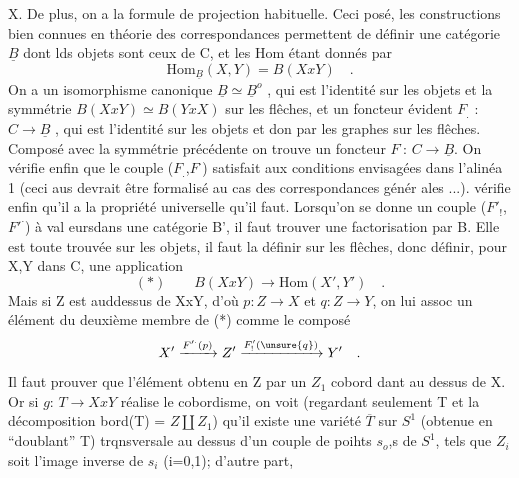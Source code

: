 
X. De plus, on a la formule de projection habituelle. Ceci posé, les
constructions bien connues en théorie des correspondances permettent
de définir une catégorie $\underline{B}$ dont lds objets sont ceux de C, et les
Hom étant donnés par
\[ \mathrm{Hom}_{\underline{B}}(X,Y) = B(XxY) \quad . \]
On a un isomorphisme canonique $\underline{B} \simeq \underline{B}^{o}$ , qui est l'identité sur les
objets et la symmétrie $B(XxY)\simeq B(YxX)$ sur les flêches, et un foncteur
évident  $F_{.}$ : $C \to \underline{B}$ , qui est l'identité sur les objets et don
par les graphes sur les flêches. Composé avec la symmétrie précédente
on trouve un foncteur $F^{\cdot}$:  $C \to \underline{B}$. On vérifie enfin que le couple
($F_{.}$,$F^{\cdot}$) satisfait aux conditions envisagées dans l'alinéa 1 (ceci aus
devrait être formalisé au cas des correspondances génér ales ...). 
vérifie enfin qu'il a la propriété universelle qu'il faut. Lorsqu'on
se donne un couple ($F'_{!}$,$F'^{\cdot}$) à val eursdans une catégorie B', il faut
trouver une factorisation par B. Elle est toute trouvée sur les
objets, il faut la définir sur les flêches, donc définir, pour X,Y
dans C, une application
\[ (*) \qquad B(XxY) \to \mathrm{Hom}(X',Y') \quad . \]
Mais si Z est auddessus de XxY, d'où $p:Z \to X$ et $q:Z \to Y$, on lui assoc
un élément du deuxième membre de (*) comme le composé
\[ X' \xrightarrow{F'^{\cdot}(p)} Z' \xrightarrow{F'_{!}(\unsure{q})} Y' \quad . \]
Il faut prouver que l'élément obtenu en  Z\hand{\unsure{,}} par un $Z_1$ cobord
dant au dessus de X. Or si $g$: $T \to XxY$ réalise le cobordisme, on
voit (regardant seulement T et la décomposition bord(T) = $Z \amalg Z_1$)
qu'il existe une variété $\overline{T}$ sur $S^1$ (obtenue en ``doublant'' T) 
 trqnsversale au dessus d'un couple de poihts $s_o$,s
de $S^1$, tels que $Z_i$ soit l'image inverse  de $s_i$ (i=0,1); d'autre part,

